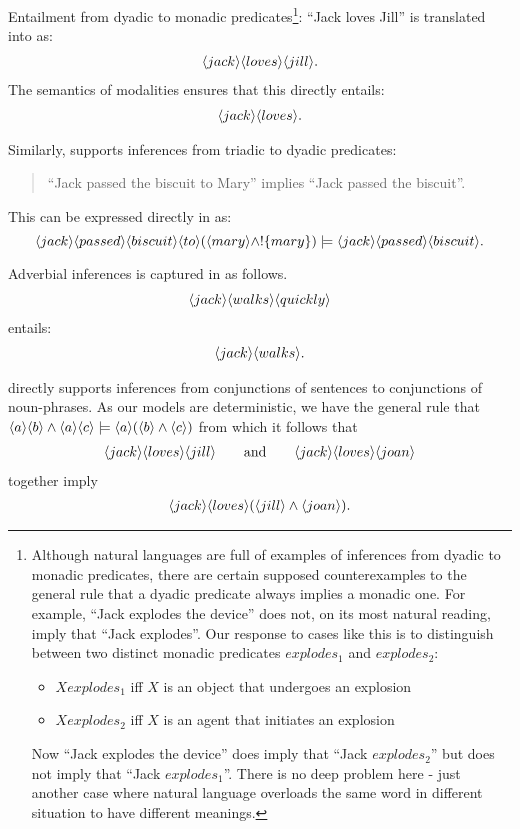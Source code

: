 \NI Entailment from dyadic to monadic predicates\footnote{Although
  natural languages are full of examples of inferences from dyadic to
  monadic predicates, there are certain supposed counterexamples to
  the general rule that a dyadic predicate always implies a monadic
  one. For example, ``Jack explodes the device'' does not, on its most
  natural reading, imply that ``Jack explodes''. Our response to cases
  like this is to distinguish between two distinct monadic predicates
  $explodes_1$ and $explodes_2$:
 \begin{itemize}
 \item
 $X explodes_1$ iff $X$ is an object that undergoes an explosion
 \item
 $X explodes_2$ iff $X$ is an agent that initiates an explosion
 \end{itemize}
 Now ``Jack explodes the device'' does imply that ``Jack $explodes_2$'' but does not imply that ``Jack $explodes_1$''. 
There is no deep problem here - just another case where natural language overloads the same word in different situation to have different meanings.}:
``Jack loves Jill'' is translated into \cathoristic{} as:
\begin{eqnarray*}
   \langle jack \rangle \langle loves \rangle \langle jill \rangle .
\end{eqnarray*}
The semantics of modalities ensures that this directly entails:
\begin{eqnarray*}
   \langle jack \rangle \langle loves \rangle .
\end{eqnarray*}

\NI Similarly, \cathoristic{} supports inferences from triadic to dyadic
predicates:
\begin{quote}
  ``Jack passed the biscuit to Mary'' implies ``Jack passed the biscuit''.
\end{quote}

\NI This can be expressed directly in \cathoristic{} as:
\[
   \langle jack \rangle \langle passed \rangle \langle biscuit \rangle \langle to \rangle (\langle mary \rangle \land !\{mary\}) \models \langle jack \rangle \langle passed \rangle \langle biscuit \rangle .
\]

\NI Adverbial inferences is captured in \cathoristic{} as follows.
\begin{eqnarray*}
  \langle jack \rangle \langle walks \rangle \langle quickly \rangle \end{eqnarray*}
entails:
\begin{eqnarray*}
  \langle jack \rangle \langle walks \rangle .
\end{eqnarray*}

\NI \Cathoristic{} directly supports inferences from conjunctions of
sentences to conjunctions of noun-phrases.  As our models are
deterministic, we have the general rule that $ \langle a \rangle \langle b \rangle \land
\langle a \rangle \langle c \rangle \models \langle a \rangle (\langle b \rangle \land \langle c \rangle )$ from which
it follows that
\begin{eqnarray*}
   \langle jack \rangle \langle loves \rangle \langle jill \rangle \qquad\text{and}\qquad
   \langle jack \rangle \langle loves \rangle \langle joan \rangle \end{eqnarray*}
together imply
\begin{eqnarray*}
\langle jack \rangle \langle loves \rangle (\langle jill \rangle \land \langle joan \rangle ).
\end{eqnarray*}

